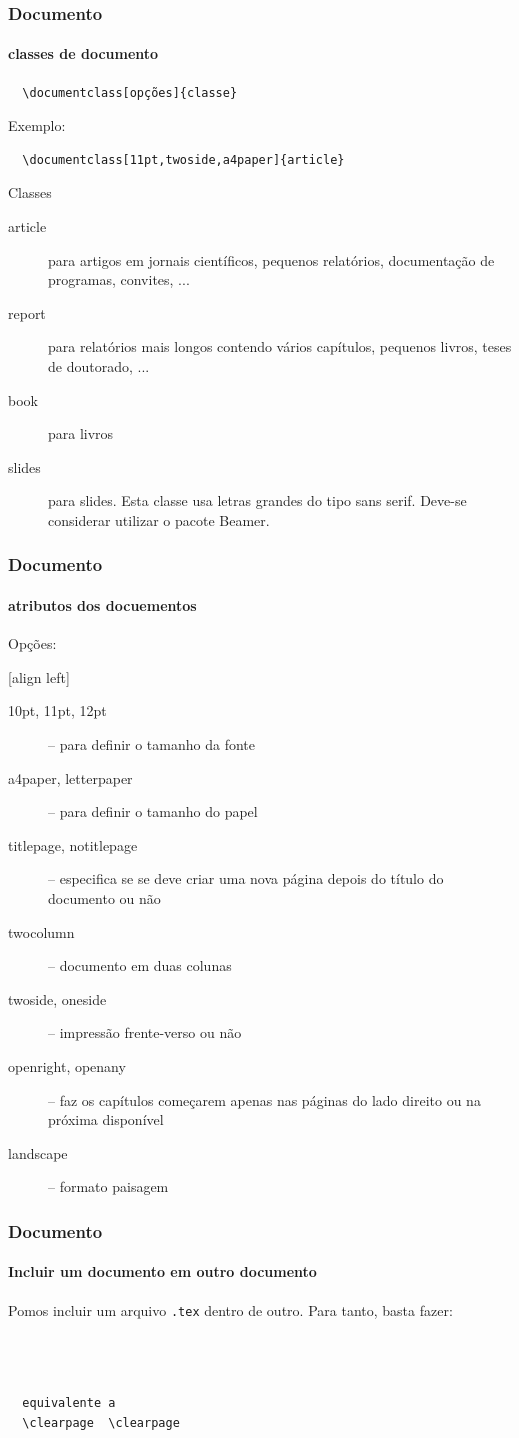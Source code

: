\begin{frame}[fragile]
\frametitle{Documento}
\framesubtitle{classes de documento}
  \begin{verbatim}
  \documentclass[opções]{classe}
  \end{verbatim}
  Exemplo:
  \begin{verbatim}
  \documentclass[11pt,twoside,a4paper]{article}
  \end{verbatim}
  Classes
  \begin{description}
  \item[article] para artigos em jornais científicos, pequenos relatórios, documentação de programas, convites, ...
  \item[report] para relatórios mais longos contendo vários capítulos, pequenos livros, teses de doutorado, ...  
  \item[book] para livros
  \item[slides] para slides. Esta classe usa letras grandes do tipo sans serif. Deve-se
       considerar utilizar o pacote Beamer.
  \end{description}

\end{frame}

\begin{frame}
\frametitle{Documento}
\framesubtitle{atributos dos docuementos}
  Opções:

  [align left]
  \begin{description}%
  \item[10pt, 11pt, 12pt] -- para definir o tamanho da fonte
  \item[a4paper, letterpaper] -- para definir o tamanho do papel
  \item[titlepage, notitlepage] -- especifica se se deve criar uma nova página depois do título do documento ou não
  \item[twocolumn] -- documento em duas colunas
  \item[twoside, oneside] -- impressão frente-verso ou não  
  \item[openright, openany] -- faz os capítulos começarem apenas nas páginas do lado direito ou na próxima disponível
  \item[landscape] -- formato paisagem
  \end{description}

\end{frame}

\begin{frame}[fragile]
\frametitle{Documento}
\framesubtitle{Incluir um documento em outro documento}
  Pomos incluir um arquivo \texttt{.tex} dentro de outro. Para tanto, basta fazer:
  
  \begin{verbatim}
  
  
   
  equivalente a 
  \clearpage  \clearpage
  \end{verbatim}
\end{frame}



